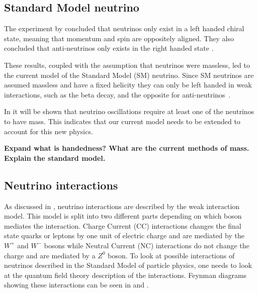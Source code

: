 \subsection{Standard Model neutrino}
The experiment by \citeauthor{1Helicity} concluded that neutrinos only exist in a left handed chiral state, meaning that momentum and spin are oppositely aligned. They also concluded that anti-neutrinos only exists in the right handed state \cite{1Helicity}. 

These results, coupled with the assumption that neutrinos were massless, led to the current model of the Standard Model (SM) neutrino. Since SM neutrinos are assumed massless and have a fixed helicity they can only be left handed in weak interactions, such as the beta decay, and the opposite for anti-neutrinos~\cite{3Peskin}.

In  it will be shown that neutrino oscillations require at least one of the neutrinos to have mass. This indicates that our current model needs to be extended to account for this new physics.

\textbf{Expand what is handedness? What are the current methods of mass. Explain the standard model.}

\subsection{Neutrino interactions}\label{subsection:Neutrino interactions}
As discussed in , neutrino interactions are described by the weak interaction model. This model is split into two different parts depending on which boson mediates the interaction.
Charge Current (CC) interactions changes the final state quarks or leptons by one unit of electric charge and are mediated by the $W^+$ and $W^-$ bosons while Neutral Current (NC) interactions do not change the charge and are mediated by a $Z^0$ boson. 
To look at possible interactions of neutrinos described in the Standard Model of particle physics, one needs to look at the quantum field theory description of the interactions\cite{3Peskin, 2Hallsjo}. Feynman diagrams showing these interactions can be seen in  and .

